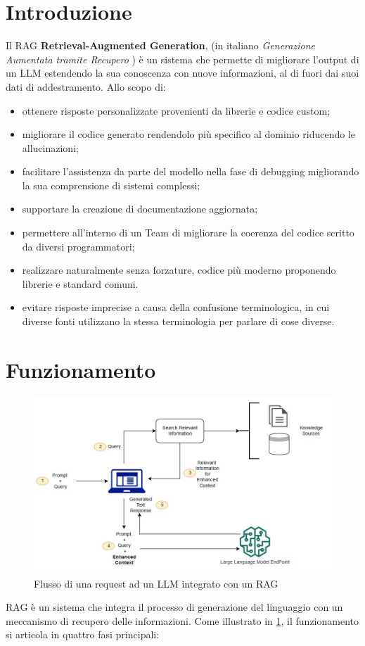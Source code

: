 \documentclass[12pt,a4paper,openright,twoside]{book}
\begin{document}
\section{Introduzione}
Il RAG \textbf{Retrieval-Augmented Generation}, (in italiano \textit{Generazione Aumentata tramite Recupero} )  è un sistema che permette di migliorare l'output di un LLM estendendo la sua conoscenza con nuove informazioni, al di fuori dai suoi dati di addestramento.
Allo scopo di:
\begin{itemize}
    \item ottenere risposte personalizzate provenienti da librerie e codice custom;
    \item migliorare il codice generato rendendolo più specifico al dominio riducendo le allucinazioni;
    \item facilitare l'assistenza da parte del modello nella fase di debugging migliorando la sua comprensione di sistemi complessi;
    \item supportare la creazione di documentazione aggiornata;
    \item permettere all'interno di un Team di migliorare la coerenza del codice scritto da diversi programmatori;
    \item realizzare naturalmente senza forzature, codice più moderno proponendo librerie e standard comuni.
    \item evitare risposte imprecise a causa della confusione terminologica, in cui diverse fonti utilizzano la stessa terminologia per parlare di cose diverse.
\end{itemize}

\section{Funzionamento}

\begin{figure}[h]
    \centering
    \includegraphics[width=.8\linewidth]{figures/jumpstart-fm-rag.jpg}
    \caption{Flusso di una request ad un LLM integrato con un RAG}
    \label{fig:jumpstart-fm-rag}
\end{figure}
RAG è un sistema che integra il processo di generazione del linguaggio con un meccanismo di recupero delle informazioni. Come illustrato in \cref{fig:jumpstart-fm-rag}, il funzionamento si articola in quattro fasi principali:
\end{document}
